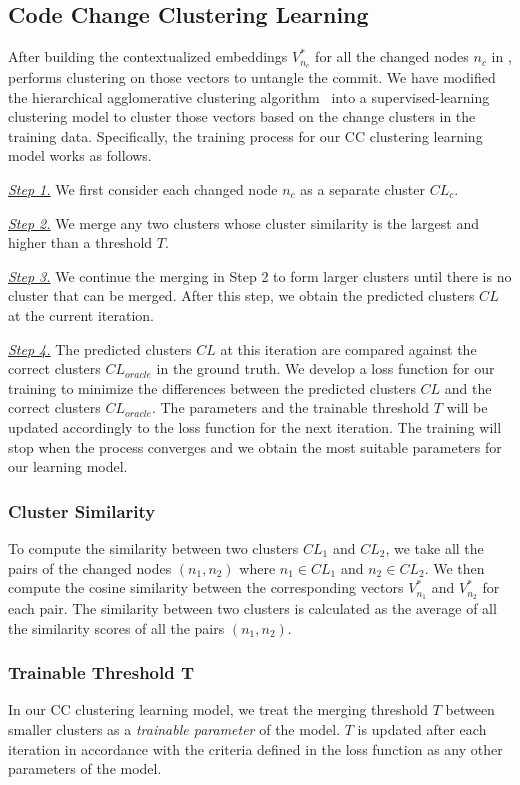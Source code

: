 \subsection{Code Change Clustering Learning}
\label{clustering:sec}

After building the contextualized embeddings $V^{*}_{n_c}$ for all the
changed nodes $n_c$ in {\mvpdg}, {\tool} performs clustering on those
vectors to untangle the commit. We have modified the hierarchical
agglomerative clustering algorithm~\cite{yi} into a
supervised-learning clustering model to cluster those vectors based on
the change clusters in the training data. Specifically, the training
process for our CC clustering learning model works as follows.

{\em \underline{Step 1.}} We first consider each changed node $n_c$ as a
separate cluster $CL_c$.

{\em \underline{Step 2.}} We merge any two clusters whose cluster
similarity is the largest and higher than a threshold $T$.

{\em \underline{Step 3.}} We continue the merging in Step 2 to form
larger clusters until there is no cluster that can be merged. After
this step, we obtain the predicted clusters $CL$ at the current
iteration.

{\em \underline{Step 4.}} The predicted clusters $CL$ at this iteration
are compared against the correct clusters $CL_{oracle}$ in the ground
truth. We develop a loss function for our training to minimize the
differences between the predicted clusters $CL$ and the correct
clusters $CL_{oracle}$. The parameters and the trainable threshold $T$
will be updated accordingly to the loss function for the next
iteration. The training will stop when the process converges and we
obtain the most suitable parameters for our learning model.

\subsubsection*{{\bf Cluster Similarity}} To compute the similarity between
two clusters $CL_1$ and $CL_2$, we take all the pairs of the changed
nodes $(n_1,n_2)$ where $n_1 \in CL_1$ and $n_2 \in CL_2$. We
then compute the cosine similarity between the corresponding vectors
$V^{*}_{n_1}$ and $V^{*}_{n_2}$ for each pair. The similarity between
two clusters is calculated as the average of all the similarity scores
of all the pairs $(n_1,n_2)$.

\subsubsection*{{\bf Trainable Threshold T}} In our CC clustering learning model,
we treat the merging threshold $T$ between smaller clusters as a {\em
  trainable parameter} of the model. $T$ is updated after each
iteration in accordance with the criteria defined in the loss function
as any other parameters of the model.

